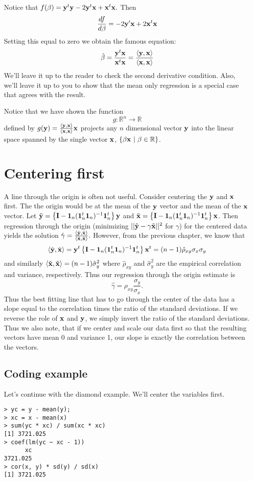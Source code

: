 Notice that
$
f(\beta) = \mathbf{y}^t \mathbf{y} - 2 \mathbf{y}^t \mathbf{x} + \mathbf{x}^t \mathbf{x}.
$
Then 
$$
\frac{df}{d\beta} = -2\mathbf{y}'\mathbf{x}  + 2 \mathbf{x}^t \mathbf{x} 
$$
Setting this equal to zero we obtain the famous equation:
$$
\hat \beta = \frac{\mathbf{y}^t \mathbf{x}}{\mathbf{x}^t \mathbf{x}}
=\frac{\langle \mathbf{y}, \mathbf{x} \rangle}{\langle \mathbf{x}, \mathbf{x} \rangle}
$$
We'll leave it up to the reader to check the second derivative 
condition. Also, we'll leave it up to you to show that the mean 
only regression is a  special case that agrees with the result.

Notice that we have shown the function
$$
g : \mathbb{R}^n \rightarrow \mathbb{R}
$$
defined by $g(\mathbf{y}) = \frac{\langle \mathbf{y}, \mathbf{x} \rangle}{\langle \mathbf{x}, \mathbf{x} \rangle}\mathbf{x}$ projects
any $n$ dimensional vector $\mathbf{y}$ into the linear space spanned
by the single vector $\mathbf{x}$, $\{\beta \mathbf{x} ~|~ \beta \in \mathbb{R}\}$.

\section{Centering first}
A line through the origin is often not useful. Consider centering the
$\mathbf{y}$ and $\mathbf{x}$ first. The the origin would be at the mean of the
$\mathbf{y}$ vector and the mean of the $\mathbf{x}$ vector. Let
$\tilde {\mathbf{y}} = \left\{ \mathbf{I} - \mathbf{1}_n (\mathbf{1}_n^t \mathbf{1}_n)^{-1} \mathbf{1}_n^t \right\} \mathbf{y}$ and $\tilde {\mathbf{x}} = \left\{ \mathbf{I} - \mathbf{1}_n (\mathbf{1}_n^t \mathbf{1}_n)^{-1} \mathbf{1}_n^t \right\} \mathbf{x}$. Then regression through the origin (minimizing
$||\tilde {\mathbf{y}} - \gamma \tilde {\mathbf{x}}||^2$ for $\gamma$)
for the centered data yields
the solution 
$
\hat \gamma = \frac{\langle \tilde {\mathbf{y}}, \tilde {\mathbf{x}} \rangle}{\langle \tilde {\mathbf{x}}, \tilde {\mathbf{x}} \rangle}.
$
However, from the previous chapter, we know that
$$
\langle \tilde {\mathbf{y}}, \tilde {\mathbf{x}} \rangle = \mathbf{y}^t \left\{ \mathbf{I} - \mathbf{1}_n (\mathbf{1}_n^t \mathbf{1}_n)^{-1} \mathbf{1}_n^t \right\} \mathbf{x}^t
= (n-1)\hat{\rho}_{xy} \sigma_x \sigma_y
$$
and similarly $\langle \tilde {\mathbf{x}}, \tilde {\mathbf{x}} \rangle = (n-1)\hat{\sigma}_y^2$
where $\hat \rho_{xy}$ and $\hat{\sigma}_y^2$ are the empirical correlation and
variance, respectively. Thus our regression through the origin estimate is
$$
\hat \gamma = \rho_{xy} \frac{\sigma_y}{\sigma_x}.
$$
Thus the best fitting line that has to go through the center of the data
has a slope equal to the correlation times the ratio of the standard deviations.
If we reverse the role of $\mathbf{x}$ and $\mathbf{y}$, we simply invert the ratio of the
standard deviations. Thus we also note, that if we center and scale our
data first so that the resulting vectors have mean 0 and variance 1, our
slope is exactly the correlation between the vectors.

\subsection{Coding example}
Let's continue with the diamond example. We'll center the variables first.
\begin{verbatim}
> yc = y - mean(y);
> xc = x - mean(x)
> sum(yc * xc) / sum(xc * xc)
[1] 3721.025
> coef(lm(yc ~ xc - 1))
      xc 
3721.025 
> cor(x, y) * sd(y) / sd(x)
[1] 3721.025
\end{verbatim}
